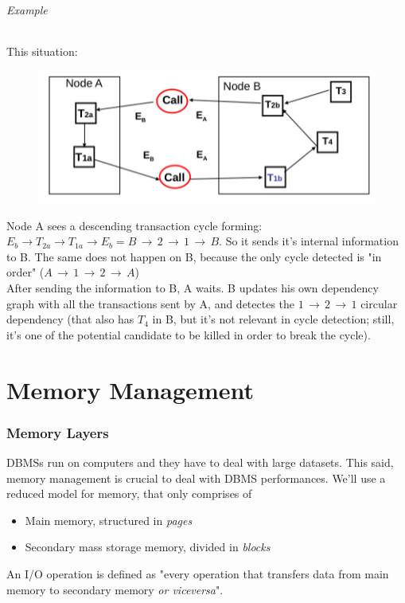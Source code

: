 \documentclass{article}
\begin{document}
				\paragraph{Example}
					This situation:
					\begin{figure}[H]
						\centering
						\includegraphics[width = \textwidth]{./images/Obermarck.png}
					\end{figure}
					Node A sees a descending transaction cycle forming: $ E_b \rightarrow T_{2a} \rightarrow T_{1a} \rightarrow E_b = B \,\rightarrow\, 2 \,\rightarrow\, 1 \,\rightarrow\, B $. So it sends it's internal information to B. The same does not happen on B, because the only cycle detected is "in order" ($A \,\rightarrow\, 1 \,\rightarrow\, 2 \,\rightarrow\, A$)\\
					After sending the information to B, A waits. B updates his own dependency graph with all the transactions sent by A, and detectes the $1 \,\rightarrow\, 2 \,\rightarrow\, 1$ circular dependency (that also has $T_4$ in B, but it's not relevant in cycle detection; still, it's one of the potential candidate to be killed in order to break the cycle).



	\part{Memory Management}
		\section{Memory Layers}
			DBMSs run on computers and they have to deal with large datasets. This said, memory management is crucial to deal with DBMS performances. We'll use a reduced model for memory, that only comprises of
			\begin{itemize}
				\item Main memory, structured in \textit{pages}
				\item Secondary mass storage memory, divided in \textit{blocks}
			\end{itemize}
			An I/O operation is defined as "every operation that transfers data from main memory to secondary memory \textit{or viceversa}".
	
\end{document}
